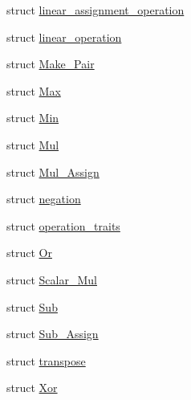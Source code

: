 \begin{DoxyCompactItemize}
\item 
struct \hyperlink{structBC_1_1oper_1_1linear__assignment__operation}{linear\+\_\+assignment\+\_\+operation}
\item 
struct \hyperlink{structBC_1_1oper_1_1linear__operation}{linear\+\_\+operation}
\item 
struct \hyperlink{structBC_1_1oper_1_1Make__Pair}{Make\+\_\+\+Pair}
\item 
struct \hyperlink{structBC_1_1oper_1_1Max}{Max}
\item 
struct \hyperlink{structBC_1_1oper_1_1Min}{Min}
\item 
struct \hyperlink{structBC_1_1oper_1_1Mul}{Mul}
\item 
struct \hyperlink{structBC_1_1oper_1_1Mul__Assign}{Mul\+\_\+\+Assign}
\item 
struct \hyperlink{structBC_1_1oper_1_1negation}{negation}
\item 
struct \hyperlink{structBC_1_1oper_1_1operation__traits}{operation\+\_\+traits}
\item 
struct \hyperlink{structBC_1_1oper_1_1Or}{Or}
\item 
struct \hyperlink{structBC_1_1oper_1_1Scalar__Mul}{Scalar\+\_\+\+Mul}
\item 
struct \hyperlink{structBC_1_1oper_1_1Sub}{Sub}
\item 
struct \hyperlink{structBC_1_1oper_1_1Sub__Assign}{Sub\+\_\+\+Assign}
\item 
struct \hyperlink{structBC_1_1oper_1_1transpose}{transpose}
\item 
struct \hyperlink{structBC_1_1oper_1_1Xor}{Xor}
\end{DoxyCompactItemize}
